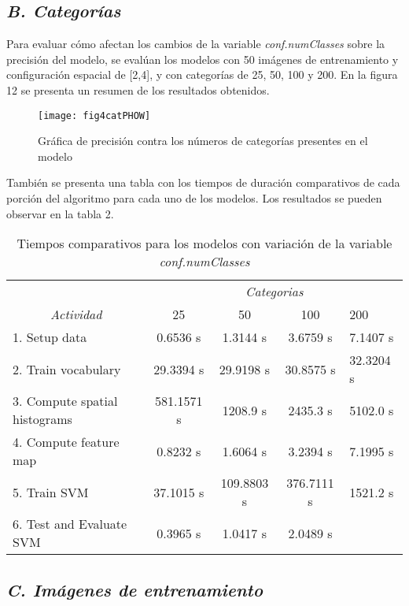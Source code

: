 \documentclass[10pt,twocolumn,letterpaper]{article}
\begin{document}
\subsection{ \textit{B. Categorías}}

Para evaluar cómo afectan los cambios de la variable \textit{conf.numClasses} sobre la precisión del modelo, se evalúan los modelos con 50 imágenes de entrenamiento y configuración espacial de [2,4], y con categorías de 25, 50, 100 y 200. En la figura 12 se presenta un resumen de los resultados obtenidos. 

\begin{figure}
\begin{center}
   \texttt{[image: fig4catPHOW]}
\end{center}
   \caption{Gráfica de precisión contra los números de categorías presentes en el modelo}
\end{figure}

También se presenta una tabla con los tiempos de duración comparativos de cada porción del algoritmo para cada uno de los modelos. Los resultados se pueden observar en la tabla 2.

\begin{table*}
\caption{Tiempos comparativos para los modelos con variación de la variable \textit{conf.numClasses}}
\centering
\begin{tabular}{lcccl}
 & \multicolumn{4}{c}{\textit{Categorias}} \\
\multicolumn{1}{c}{\textit{Actividad}} & 25 & 50 & 100 & 200 \\ \hline
1. Setup data & 0.6536 s & 1.3144 s & 3.6759 s & 7.1407 s \\ \hline
2. Train vocabulary & 29.3394 s & 29.9198 s & 30.8575 s & 32.3204 s \\ \hline
3. Compute spatial histograms & 581.1571 s & 1208.9 s & 2435.3 s & 5102.0 s \\ \hline
4. Compute feature map & 0.8232 s & 1.6064 s & 3.2394 s & 7.1995 s \\ \hline
5. Train SVM & 37.1015 s & 109.8803 s & 376.7111 s & 1521.2 s \\ \hline
6. Test and Evaluate SVM & 0.3965 s & 1.0417 s & 2.0489 s &  \\ \hline
\end{tabular}
\end{table*}

\subsection{ \textit{C. Imágenes de entrenamiento}}
\end{document}
